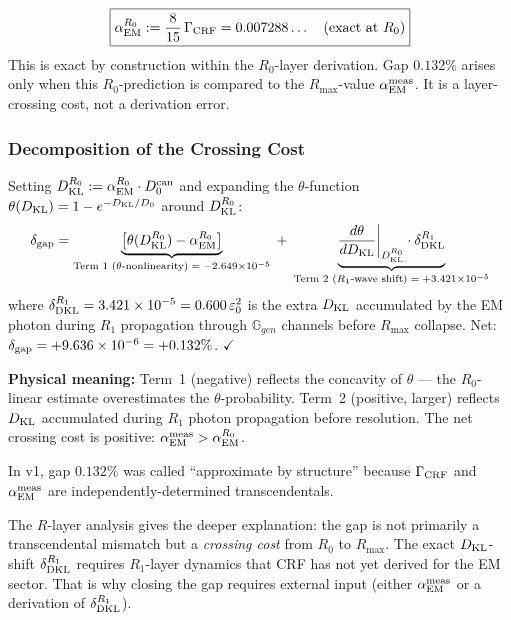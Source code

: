 \documentclass[12pt, a4paper]{article}
\begin{document}
\begin{derivedbox}[title={FIND-ZC25-11 (v2): Exact Relation at $R_0$}]
\[
  \boxed{\alpha_{\rm EM}^{R_0}
  := \frac{8}{15}\,\Gamma_{\rm CRF}
  = 0.007288\ldots \quad \text{(exact at }R_0\text{)}}
\]
This is exact by construction within the $R_0$-layer derivation.
Gap $0.132\%$ arises only when this $R_0$-prediction is compared
to the $R_{\max}$-value $\alpha_{\rm EM}^{\rm meas}$.
It is a layer-crossing cost, not a derivation error.
\end{derivedbox}

\subsubsection{Decomposition of the Crossing Cost}

\begin{derivedbox}[title={FIND-ZC25-10 (v2): Gap Decomposes into
  Two R-Layer Terms}]
Setting $D_{\rm KL}^{R_0} := \alpha_{\rm EM}^{R_0}\cdot D_0^{\rm can}$
and expanding the $\theta$-function
$\theta(D_{\rm KL}) = 1 - e^{-D_{\rm KL}/D_0}$ around
$D_{\rm KL}^{R_0}$:
\[
  \delta_{\rm gap}
  = \underbrace{\bigl[\theta(D_{\rm KL}^{R_0}) - \alpha_{\rm EM}^{R_0}\bigr]}_{
      \text{Term 1 (}\theta\text{-nonlinearity)}
      \;=\;{-2.649\times10^{-5}}}
  \;+\;
  \underbrace{\frac{d\theta}{dD_{\rm KL}}\bigg|_{D_{\rm KL}^{R_0}}
    \cdot\delta_{\rm DKL}^{R_1}}_{
      \text{Term 2 (}R_1\text{-wave shift)}
      \;=\;{+3.421\times10^{-5}}}
\]
where $\delta_{\rm DKL}^{R_1} = 3.421\times10^{-5}
= 0.600\,\varepsilon_0^2$ is the extra $D_{\rm KL}$ accumulated
by the EM photon during $R_1$ propagation through
$\mathbb{G}_{gen}$ channels before $R_{\max}$ collapse.
Net: $\delta_{\rm gap} = +9.636\times10^{-6} = +0.132\%$. $\checkmark$

\medskip
\textbf{Physical meaning:}
Term~1 (negative) reflects the concavity of $\theta$ ---
the $R_0$-linear estimate overestimates the
$\theta$-probability.
Term~2 (positive, larger) reflects $D_{\rm KL}$ accumulated
during $R_1$ photon propagation before resolution.
The net crossing cost is positive: $\alpha_{\rm EM}^{\rm meas}
> \alpha_{\rm EM}^{R_0}$.
\end{derivedbox}

\begin{derivedbox}[title={FIND-ZC25-04 (reframed v2): Gap
  Requires External $\alpha_{\rm EM}$ Because It Is a
  Layer-Crossing Cost}]
In v1, gap $0.132\%$ was called ``approximate by structure''
because $\Gamma_{\rm CRF}$ and $\alpha_{\rm EM}^{\rm meas}$
are independently-determined transcendentals.

\medskip
The $R$-layer analysis gives the deeper explanation:
the gap is not primarily a transcendental mismatch but a
\emph{crossing cost} from $R_0$ to $R_{\max}$.
The exact $D_{\rm KL}$-shift $\delta_{\rm DKL}^{R_1}$
requires $R_1$-layer dynamics that CRF has not yet derived
for the EM sector. That is why closing the gap requires
external input (either $\alpha_{\rm EM}^{\rm meas}$ or a
derivation of $\delta_{\rm DKL}^{R_1}$).
\end{derivedbox}
\end{document}
